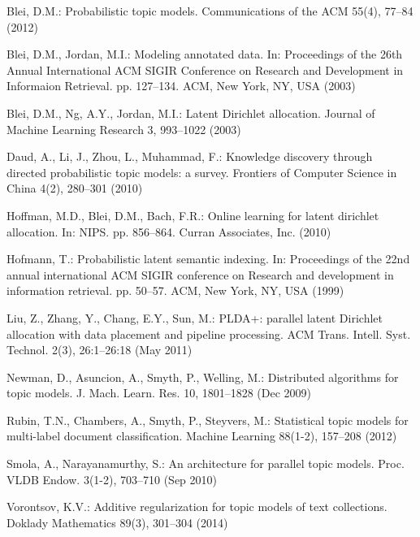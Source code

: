 \documentclass[russian,english]{llncs}
\begin{document}
\begin{thebibliography}{10}

Blei, D.M.: Probabilistic topic models. Communications of the ACM  55(4),
  77--84 (2012)

Blei, D.M., Jordan, M.I.: Modeling annotated data. In: Proceedings of the 26th
  Annual International ACM SIGIR Conference on Research and Development in
  Informaion Retrieval. pp. 127--134. ACM, New York, NY, USA (2003)

Blei, D.M., Ng, A.Y., Jordan, M.I.: Latent {Dirichlet} allocation. Journal of
  Machine Learning Research  3,  993--1022 (2003)

Daud, A., Li, J., Zhou, L., Muhammad, F.: Knowledge discovery through directed
  probabilistic topic models: a survey. Frontiers of Computer Science in China
  4(2),  280--301 (2010)

Hoffman, M.D., Blei, D.M., Bach, F.R.: Online learning for latent dirichlet
  allocation. In: NIPS. pp. 856--864. Curran Associates, Inc. (2010)

Hofmann, T.: Probabilistic latent semantic indexing. In: Proceedings of the
  22nd annual international ACM SIGIR conference on Research and development in
  information retrieval. pp. 50--57. ACM, New York, NY, USA (1999)

Liu, Z., Zhang, Y., Chang, E.Y., Sun, M.: {PLDA+:} parallel latent {D}irichlet
  allocation with data placement and pipeline processing. ACM Trans. Intell.
  Syst. Technol.  2(3),  26:1--26:18 (May 2011)

Newman, D., Asuncion, A., Smyth, P., Welling, M.: Distributed algorithms for
  topic models. J. Mach. Learn. Res.  10,  1801--1828 (Dec 2009)

Rubin, T.N., Chambers, A., Smyth, P., Steyvers, M.: Statistical topic models
  for multi-label document classification. Machine Learning  88(1-2),  157--208
  (2012)

Smola, A., Narayanamurthy, S.: An architecture for parallel topic models. Proc.
  VLDB Endow.  3(1-2),  703--710 (Sep 2010)

Vorontsov, K.V.: Additive regularization for topic models of text collections.
  Doklady Mathematics  89(3),  301--304 (2014)


\end{thebibliography}
\end{document}
